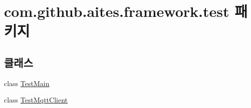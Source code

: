 \hypertarget{namespacecom_1_1github_1_1aites_1_1framework_1_1test}{}\section{com.\+github.\+aites.\+framework.\+test 패키지}
\label{namespacecom_1_1github_1_1aites_1_1framework_1_1test}
\subsection*{클래스}
\begin{DoxyCompactItemize}
\item 
class \mbox{\hyperlink{classcom_1_1github_1_1aites_1_1framework_1_1test_1_1_test_main}{Test\+Main}}
\item 
class \mbox{\hyperlink{classcom_1_1github_1_1aites_1_1framework_1_1test_1_1_test_mqtt_client}{Test\+Mqtt\+Client}}
\end{DoxyCompactItemize}
